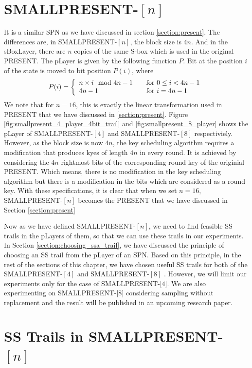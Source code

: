 \section{SMALLPRESENT-$[n]$} \label{section:smallpresent-n}
It is a similar SPN as we have discussed in section \ref{section:present}. The differences are, in SMALLPRESENT-$[n]$, the block size is $4n$. And in the sBoxLayer, there are $n$ copies of the same S-box which is used in the original PRESENT. The pLayer is given by the following function $P$. Bit at the position $i$ of the state is moved to bit position $P\left(i\right)$, where
\[ P(i) = \left\{
  \begin{array}{l l}
    n \times i \mod{4n - 1} & \quad \text{for $0 \leq i < 4n -1$}\\
    4n - 1 & \quad \text{for $i = 4n-1$}
  \end{array} \right.\]
We note that for $n = 16$, this is exactly the linear transformation used in PRESENT that we have discussed in \ref{section:present}. Figure \ref{fig:smallpresent_4_player_4bit_trail} and \ref{fig:smallpresent_8_player} shows the pLayer of SMALLPRESENT-$[4]$ and SMALLPRESENT-$[8]$ respectiviely. However, as the block size is  now $4n$, the key scheduling algorithm requires a modification that produces kyes of length $4n$ in every round. It is achieved by considering the $4n$ rightmost bits of the corresponding round key of the originial PRESENT. Which means, there is no modification in the key scheduling algorithm but there is a modification in the bits which are considered as a round key. With these specifications, it is clear that when we set $n=16$, SMALLPRESENT-$[n]$ becomes the PRESENT that we have discussed in Section \ref{section:present} \par \noindent Now as we have defined SMALLPRESENT-$[n]$, we need to find feasible SS trails in the pLayers of them, so that we can use these trails in our experiments. In Section \ref{section:choosing_ssa_trail}, we have discussed the principle of choosing an SS trail from the pLayer of an SPN. Based on this principle, in the rest of the sections of this chapter, we have chosen useful SS trails for both of the SMALLPRESENT-$[4]$ and SMALLPRESENT-$[8]$ . However, we will limit our experiments only for the case of SMALLPRESENT-[$4$]. We are also experimenting on SMALLPRESENT-[$8$] considering sampling without replacement and the result will be published in an upcoming research paper.


\section{SS Trails in SMALLPRESENT-$[n]$}
